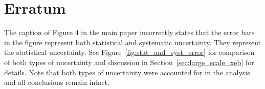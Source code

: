 \documentclass[%
 reprint,
superscriptaddress,
 amsmath,amssymb,
 pra,
]{revtex4-2}
\begin{document}
\vspace{5mm}

\section*{Erratum}
The caption of Figure 4 in the main paper \cite{arute2019} incorrectly states that the error bars in the figure represent both statistical and systematic uncertainty. They represent the statistical uncertainty. See Figure~\ref{fig:stat_and_syst_error} for comparison of both types of uncertainty and discussion in Section~\ref{sec:large_scale_xeb} for details. Note that both types of uncertainty were accounted for in the analysis and all conclusions remain intact.



\providecommand{\noopsort}[1]{}\providecommand{\singleletter}[1]{#1}
\end{document}
